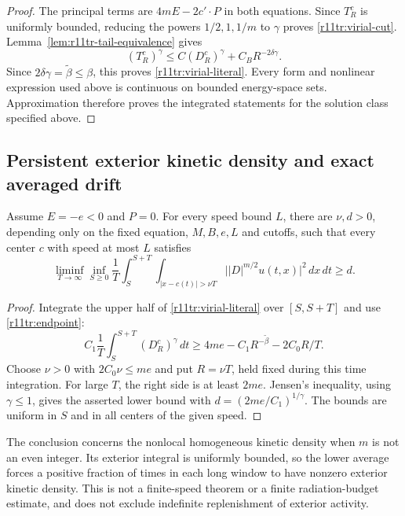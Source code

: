 \begin{proof}
The principal terms are $4mE-2c'\cdot P$ in both equations.
Since $T_R^c$ is uniformly bounded, reducing the powers
$1/2,1,1/m$ to $\gamma$ proves \eqref{r11tr:virial-cut}.
Lemma~\ref{lem:r11tr-tail-equivalence} gives
\[
 (T_R^c)^\gamma\le C(D_R^c)^\gamma+C_BR^{-2\delta\gamma}.
\]
Since $2\delta\gamma=\widetilde\beta\le\beta$, this proves
\eqref{r11tr:virial-literal}. Every form and nonlinear expression
used above is continuous on bounded energy-space sets. Approximation
therefore proves the integrated statements for the solution class
specified above.
\end{proof}

\subsection{Persistent exterior kinetic density and exact averaged drift}

\begin{theorem}
\label{thm:r11tr-ballistic}
Assume $E=-e<0$ and $P=0$. For every speed bound $L$, there are
$\nu,d>0$, depending only on the fixed equation, $M,B,e,L$ and
cutoffs, such that every center $c$ with speed at most $L$ satisfies
\begin{equation}\label{r11tr:ballistic}
 \liminf_{T\to\infty}\inf_{S\ge0}\frac1T
  \int_S^{S+T}\int_{|x-c(t)|>\nu T}
                \bigl||D|^{m/2}u(t,x)\bigr|^2\,dx\,dt
 \ge d.
\end{equation}
\end{theorem}
\begin{proof}
Integrate the upper half of \eqref{r11tr:virial-literal} over
$[S,S+T]$ and use \eqref{r11tr:endpoint}:
\[
 C_1\frac1T\int_S^{S+T}(D_R^c)^\gamma\,dt
 \ge4me-C_1R^{-\widetilde\beta}-2C_0R/T.
\]
Choose $\nu>0$ with $2C_0\nu\le me$ and put $R=\nu T$,
held fixed during this time integration. For large $T$, the right
side is at least $2me$. Jensen's inequality, using $\gamma\le1$,
gives the asserted lower bound with $d=(2me/C_1)^{1/\gamma}$.
The bounds are uniform in $S$ and in all centers of the given speed.
\end{proof}

\begin{remark}
The conclusion concerns the nonlocal homogeneous kinetic density when
$m$ is not an even integer. Its exterior integral is uniformly bounded,
so the lower average forces a positive fraction of times in each long
window to have nonzero exterior kinetic density. This is not a
finite-speed theorem or a finite radiation-budget estimate, and does
not exclude indefinite replenishment of exterior activity.
\end{remark}

